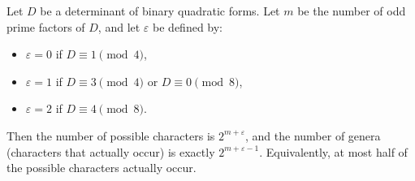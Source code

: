 Let $D$ be a determinant of binary quadratic forms. Let $m$ be the number of odd prime factors of $D$, and let $\varepsilon$ be defined by:
\begin{itemize}
\item $\varepsilon = 0$ if $D \equiv 1 \pmod{4}$,
\item $\varepsilon = 1$ if $D \equiv 3 \pmod{4}$ or $D \equiv 0 \pmod{8}$,
\item $\varepsilon = 2$ if $D \equiv 4 \pmod{8}$.
\end{itemize}
Then the number of possible characters is $2^{m+\varepsilon}$, and the number of genera (characters that actually occur) is exactly $2^{m+\varepsilon-1}$. Equivalently, at most half of the possible characters actually occur.
